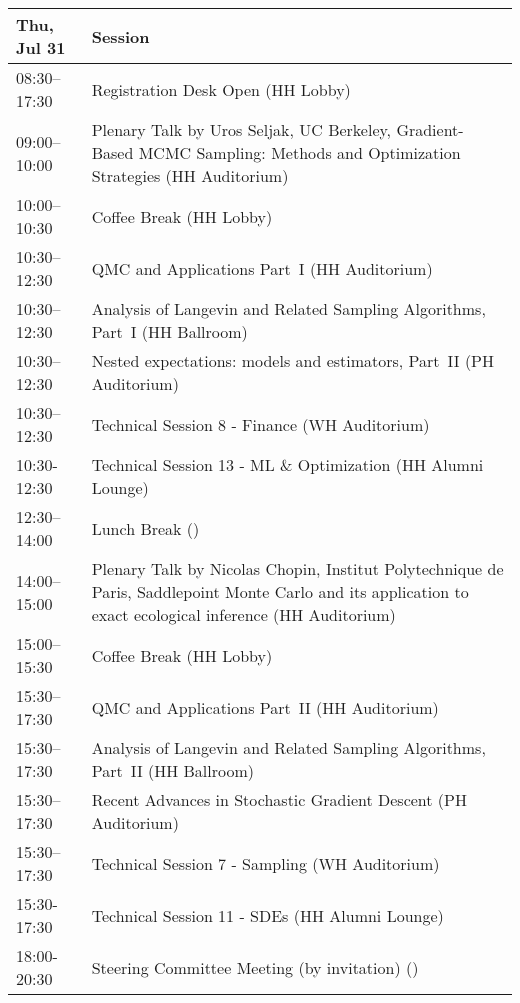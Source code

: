 \begin{table}
{\footnotesize
\begin{tabularx}{\textwidth}{>{\hsize=0.32\hsize}X|>{\hsize=1.7\hsize}X}
\hline
\textbf{Thu, Jul 31} & \textbf{Session} \\
\hline
\cellcolor{\EmptyColor}08:30–17:30 & \cellcolor{\EmptyColor}Registration Desk Open (HH Lobby) \\
\cellcolor{\PlenaryColor}09:00–10:00 & \cellcolor{\PlenaryColor}Plenary Talk by Uros Seljak, UC Berkeley, Gradient-Based MCMC Sampling: Methods and Optimization Strategies (HH Auditorium) \\
\cellcolor{\EmptyColor}10:00–10:30 & \cellcolor{\EmptyColor}Coffee Break (HH Lobby) \\
\cellcolor{\SessionTitleColor}10:30–12:30 & \cellcolor{\SessionTitleColor}QMC and Applications Part~I (HH Auditorium) \\
\cellcolor{\SessionTitleColor}10:30–12:30 & \cellcolor{\SessionTitleColor}Analysis of Langevin and Related Sampling Algorithms, Part~I (HH Ballroom) \\
\cellcolor{\SessionTitleColor}10:30–12:30 & \cellcolor{\SessionTitleColor}Nested expectations: models and estimators, Part~II (PH Auditorium) \\
\cellcolor{\SessionLightColor}10:30–12:30 & \cellcolor{\SessionLightColor}Technical Session 8 - Finance (WH Auditorium) \\
\cellcolor{\SessionLightColor}10:30-12:30 & \cellcolor{\SessionLightColor}Technical Session 13 - ML \& Optimization (HH Alumni Lounge) \\
\cellcolor{\EmptyColor}12:30–14:00 & \cellcolor{\EmptyColor}Lunch Break () \\
\cellcolor{\PlenaryColor}14:00–15:00 & \cellcolor{\PlenaryColor}Plenary Talk by Nicolas Chopin, Institut Polytechnique de Paris, Saddlepoint Monte Carlo and its application to exact ecological inference (HH Auditorium) \\
\cellcolor{\EmptyColor}15:00–15:30 & \cellcolor{\EmptyColor}Coffee Break (HH Lobby) \\
\cellcolor{\SessionTitleColor}15:30–17:30 & \cellcolor{\SessionTitleColor}QMC and Applications Part~II (HH Auditorium) \\
\cellcolor{\SessionTitleColor}15:30–17:30 & \cellcolor{\SessionTitleColor}Analysis of Langevin and Related Sampling Algorithms, Part~II (HH Ballroom) \\
\cellcolor{\SessionTitleColor}15:30–17:30 & \cellcolor{\SessionTitleColor}Recent Advances in Stochastic Gradient Descent (PH Auditorium) \\
\cellcolor{\SessionLightColor}15:30–17:30 & \cellcolor{\SessionLightColor}Technical Session 7 - Sampling (WH Auditorium) \\
\cellcolor{\SessionLightColor}15:30-17:30 & \cellcolor{\SessionLightColor}Technical Session 11 - SDEs (HH Alumni Lounge) \\
\cellcolor{\SessionTitleColor}18:00-20:30 & \cellcolor{\SessionTitleColor}Steering Committee Meeting (by invitation) () \\
\hline
\end{tabularx}
}
\end{table}

